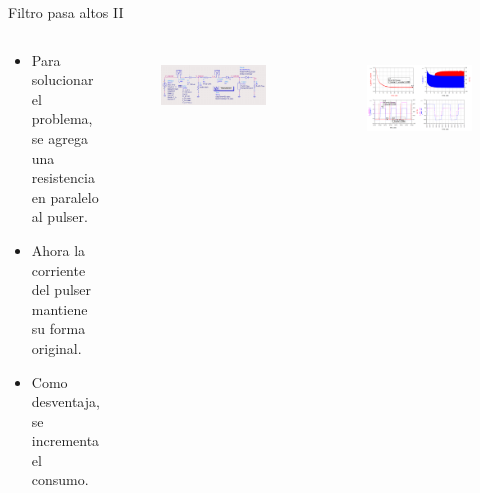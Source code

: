 \documentclass{beamer}
\begin{document}
\begin{frame}{Filtro pasa altos II}

    \begin{columns}[c]
        \begin{block}{}
            \begin{itemize}
                \item Para solucionar el problema, se agrega una resistencia en
                    paralelo al pulser.
                \item Ahora la corriente del pulser mantiene su forma original.
                \item Como desventaja, se incrementa el consumo.
            \end{itemize}
        \end{block}
        \begin{figure}[t]
            \centering
            \includegraphics[width=\textwidth]{images/highpass_nonlinear_w_shunt_sch.png}
            \label{fig:sch_highpass_non_linear_w_shunt_simulation}
        \end{figure}
        \begin{figure}[tbp]
            \centering
            \includegraphics[width=\textwidth]{images/highpass_nonlinear_w_shunt_sim_result.png}
            \label{fig:highpass_non_linear_w_shunt_simulation_result}
        \end{figure}
    \end{columns}

\end{frame}
\end{document}
